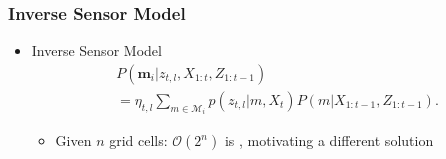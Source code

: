 \documentclass[11pt,professionalfonts,hyperref={pdftex,pdfpagemode=none,pdfstartview=FitH}]{beamer}
\renewcommand{\emph}[1]{\textit{\textbf{\color{blue}{#1}}}}
\begin{document}
\begin{frame}
\frametitle{Inverse Sensor Model}

\begin{itemize}
	\item Inverse Sensor Model
	\begin{align*}
&P(\mathbf{m}_i|z_{t,l},X_{1:t},Z_{1:t-1})\nonumber
\\
&=\eta_{t,l}\sum_{m\in\mathcal{M}_i}p(z_{t,l}|m,X_{t})P(m|X_{1:t-1},Z_{1:t-1}).
\end{align*}
	\begin{itemize}
	\item Given $n$ grid cells: $\mathcal O(2^n)$ is \emph{computationally intractable}, motivating a different solution
	\end{itemize}
\end{itemize}

\end{frame}
\end{document}
